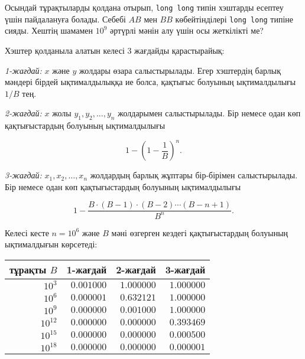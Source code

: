 Осындай тұрақтыларды қолдана отырып,
\texttt{long long} типін хэштарды есептеу үшін
пайдалануға болады. Себебі $AB$ мен $BB$ көбейтінділері \texttt{long long}
типіне сияды. Хештің шамамен $10^9$ әртүрлі мәнін алу үшін осы жеткілікті ме?


Хэштер қолданыла алатын келесі 3 жағдайды қарастырайық:


\textit{1-жағдай:} $x$ және $y$ жолдары өзара салыстырылады.
Егер хэштердің барлық 
мәндері бірдей ықтималдылыққа ие болса, қақтығыс болуының ықтималдылығы $1/B$ тең.


\textit{2-жағдай:} $x$ жолы $y_1,y_2,\ldots,y_n$ жолдарымен
салыстырылады. Бір немесе одан көп қақтығыстардың болуының 
ықтималдылығы


\[1-(1-\frac{1}{B})^n.\]

\textit{3-жағдай:} $x_1,x_2,\ldots,x_n$ жолдардың барлық жұптары
бір-бірімен салыстырылады. Бір немесе одан көп қақтығыстардың болуының 
ықтималдылығы

\[ 1 - \frac{B \cdot (B-1) \cdot (B-2) \cdots (B-n+1)}{B^n}.\]

Келесі кесте $n=10^6$ және $B$ мәні өзгерген кездегі қақтығыстардың
болуының ықтималдығын көрсетеді:

\begin{center}
\begin{tabular}{rrrr}
тұрақты $B$ & 1-жағдай & 2-жағдай & 3-жағдай \\
\hline
$10^3$ & $0.001000$ & $1.000000$ & $1.000000$ \\
$10^6$ & $0.000001$ & $0.632121$ & $1.000000$ \\
$10^9$ & $0.000000$ & $0.001000$ & $1.000000$ \\
$10^{12}$ & $0.000000$ & $0.000000$ & $0.393469$ \\
$10^{15}$ & $0.000000$ & $0.000000$ & $0.000500$ \\
$10^{18}$ & $0.000000$ & $0.000000$ & $0.000001$ \\
\end{tabular}
\end{center}

